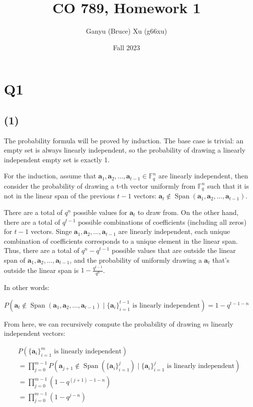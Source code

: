 \documentclass{article}
\title{CO 789, Homework 1}
\author{Ganyu (Bruce) Xu (g66xu)}
\date{Fall 2023}
\begin{document}

\section*{Q1}
\subsection*{(1)}
The probability formula will be proved by induction. The base case is trivial: an empty set is always linearly independent, so the probability of drawing a linearly independent empty set is exactly 1.

For the induction, assume that $\mathbf{a}_1, \mathbf{a}_2, \ldots, \mathbf{a}_{t-1} \in \mathbb{F}_q^n$ are linearly independent, then consider the probability of drawing a t-th vector uniformly from $\mathbb{F}_q^n$ such that it is not in the linear span of the previous $t-1$ vectors: $\mathbf{a}_t \notin \operatorname{Span}(\mathbf{a}_1, \mathbf{a}_2, \ldots, \mathbf{a}_{t-1})$.

There are a total of $q^n$ possible values for $\mathbf{a}_t$ to draw from. On the other hand, there are a total of $q^{t-1}$ possible combinations of coefficients (including all zeros) for $t-1$ vectors. Singe $\mathbf{a}_1, \mathbf{a}_2, \ldots, \mathbf{a}_{t-1}$ are linearly independent, each unique combination of coefficients corresponds to a unique element in the linear span. Thus, there are a total of $q^n - q^{t-1}$ possible values that are outside the linear span of $\mathbf{a}_1, \mathbf{a}_2, \ldots, \mathbf{a}_{t-1}$, and the probability of uniformly drawing a $\mathbf{a}_t$ that's outside the linear span is $1 - \frac{q^{t-1}}{q^n}$.

In other words:

$$
P(
    \mathbf{a}_t 
    \notin \operatorname{Span}(\mathbf{a}_1, \mathbf{a}_2, \ldots, \mathbf{a}_{t-1})
    \mid \{\mathbf{a}_i\}_{i=1}^{t-1} \text{ is linearly independent}
) = 1 - q^{t-1-n}
$$

From here, we can recursively compute the probability of drawing $m$ linearly independent vectors:

$$
\begin{aligned}
&P(\{\mathbf{a}_i\}_{i=1}^m \text{ is linearly independent}) \\
&= \prod_{j=0}^{m-1} P(
    \mathbf{a}_{j+1} 
    \notin \operatorname{Span}(\{\mathbf{a}_i\}_{i=1}^{j})
    \mid \{\mathbf{a}_i\}_{i=1}^{j} \text{ is linearly independent}
) \\
&= \prod_{j=0}^{m-1}(1 - q^{(j+1) - 1 - n}) \\
&= \prod_{j=0}^{m-1}(1 - q^{j - n})
\end{aligned}
$$
\end{document}
